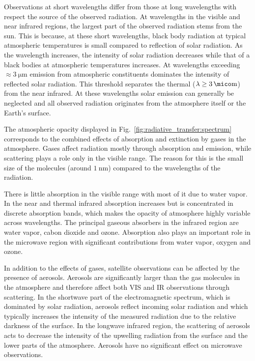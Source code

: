 Observations at short wavelengths differ from those at long wavelengths with
respect the source of the observed radiation. At wavelengths in the visible and
near infrared regions, the largest part of the observed radiation stems from the
sun. This is because, at these short wavelengths, black body radiation at
typical atmospheric temperatures is small compared to reflection of solar
radiation. As the wavelength increases, the intensity of solar radiation decreases
while that of a black bodies at atmospheric temperatures increases. At wavelengths
exceeding $\approx \SI{3}{\micro \meter}$ emission from atmospheric constituents
dominates the intensity of reflected solar radiation. This threshold separates
the thermal ($\lambda \geq \SI{3}{\mico \meter}$) from the near infrared. At
these wavelengths solar emission can generally be neglected and all observed
radiation originates from the atmosphere itself or the Earth's surface.

The atmospheric opacity displayed in Fig.~\ref{fig:radiative_transfer:spectrum}
corresponds to the combined effects of absorption and extinction by gases in the
atmosphere. Gases affect radiation mostly through absorption and emission, while
scattering plays a role only in the visible range. The reason for this is the
small size of the molecules (around $\SI{1}{\nano \meter}$) compared to the
wavelengths of the radiation.

There is little absorption in the visible range with most of it due to water
vapor. In the near and thermal infrared absorption increases but is concentrated
in discrete absorption bands, which makes the opacity of atmosphere highly
variable across wavelengths. The principal gaseous absorbers in the infrared
region are water vapor, cabon dioxide and ozone. Absorption also plays an
important role in the microwave region with significant contributions from water
vapor, oxygen and ozone. 

In addition to the effects of gases, satellite observations can be affected by
the presence of aerosols. Aerosols are significantly larger than the gas
molecules in the atmosphere and therefore affect both VIS and IR observations
through scattering. In the shortwave part of the electromagnetic spectrum, which
is dominated by solar radiation, aerosols reflect incoming solar radiation and
which typically increases the intensity of the measured radiation due to the
relative darkness of the surface. In the longwave infrared region, the
scattering of aerosols acts to decrease the intensity of the upwelling radiation
from the surface and the lower parts of the atmosphere. Aerosols have no
significant effect on microwave observations.

